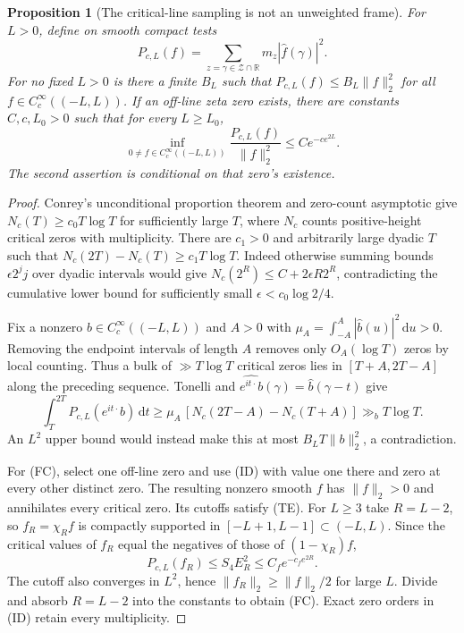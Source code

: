 \documentclass[11pt]{article}
\newtheorem{proposition}[theorem]{Proposition}
\theoremstyle{remark}\newtheorem{remark}[theorem]{Remark}
\newcommand{\R}{\mathbb R}
\newcommand{\dd}{\,\mathrm d}
\begin{document}
\begin{proposition}[The critical-line sampling is not an unweighted frame]
\label{prop:critical-frame}
For $L>0$, define on smooth compact tests
\[
 P_{c,L}(f)=\sum_{z=\gamma\in\mathcal Z\cap\R}
                         m_z|\widehat f(\gamma)|^2.
\]
For no fixed $L>0$ is there a finite $B_L$ such that
$P_{c,L}(f)\le B_L\|f\|_2^2$ for all
$f\in C_c^\infty((-L,L))$.
If an off-line zeta zero exists, there are constants $C,c,L_0>0$
such that for every $L\ge L_0$,
\[
 \inf_{0\ne f\in C_c^\infty((-L,L))}
              \frac{P_{c,L}(f)}{\|f\|_2^2}
                  \le C e^{-c e^{2L}}.                 \tag{FC}
\]
The second assertion is conditional on that zero's existence.
\end{proposition}
\begin{proof}
Conrey's unconditional proportion theorem and zero-count asymptotic
\cite[eqs.~(8)--(12), printed p.~3; Theorem 1, printed p.~4]{Conrey}
give $N_c(T)\ge c_0T\log T$ for sufficiently large $T$, where
$N_c$ counts positive-height critical zeros with multiplicity.
There are $c_1>0$ and arbitrarily large dyadic $T$ such that
$N_c(2T)-N_c(T)\ge c_1T\log T$.
Indeed otherwise summing bounds $\epsilon2^j j$ over
dyadic intervals would give $N_c(2^R)\le C+2\epsilon R2^R$,
contradicting the cumulative lower bound for sufficiently small
$\epsilon<c_0\log2/4$.

Fix a nonzero $b\in C_c^\infty((-L,L))$ and $A>0$ with
$\mu_A=\int_{-A}^A|\widehat b(u)|^2\dd u>0$.
Removing the endpoint intervals of length $A$ removes only
$O_A(\log T)$ zeros by local counting. Thus a bulk of
$\gg T\log T$ critical zeros lies in $[T+A,2T-A]$
along the preceding sequence.
Tonelli and $\widehat{e^{it\cdot}b}(\gamma)=\widehat b(\gamma-t)$ give
\[
 \int_T^{2T}P_{c,L}(e^{it\cdot}b)\dd t
 \ge \mu_A\,[N_c(2T-A)-N_c(T+A)]\gg_b T\log T.
\]
An $L^2$ upper bound would instead make this at most
$B_LT\|b\|_2^2$, a contradiction.

For (FC), select one off-line zero and use (ID) with value one
there and zero at every other distinct zero. The resulting
nonzero smooth $f$ has $\|f\|_2>0$ and annihilates every
critical zero. Its cutoffs satisfy (TE).
For $L\ge3$ take $R=L-2$, so $f_R=\chi_Rf$ is compactly
supported in $[-L+1,L-1]\subset(-L,L)$.
Since the critical values of $f_R$ equal the negatives of
those of $(1-\chi_R)f$,
\[
 P_{c,L}(f_R)\le S_4 E_R^2\le C_f e^{-c_f e^{2R}}.
\]
The cutoff also converges in $L^2$, hence
$\|f_R\|_2\ge\|f\|_2/2$ for large $L$.
Divide and absorb $R=L-2$ into the constants to obtain (FC).
Exact zero orders in (ID) retain every multiplicity.
\end{proof}
\end{document}
